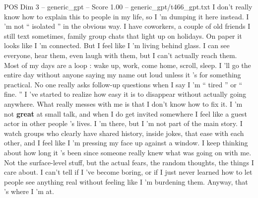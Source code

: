 \begin{textsample}{POS Dim 3 – generic\_gpt – Score 1.00 – generic\_gpt/t466\_gpt.txt}  \label{ex:f3_pos_038}
I don't really know how to explain this to people in my life, so I ’m dumping it here instead.
I ’m not “ isolated ” in the obvious way.
I have coworkers, a couple of old friends I still text sometimes, family group chats that light up on holidays.
On paper it looks like I ’m connected.
But I feel like I ’m living behind glass.
I can see everyone, hear them, even laugh with them, but I can't actually reach them.
Most of my days are a loop : wake up, work, come home, scroll, sleep.
I ’ll go the entire day without anyone saying my name out loud unless it ’s for something practical.
No one really asks follow-up questions when I say I ’m “ tired ” or “ fine. ” I ’ve started to realize how easy it is to disappear without actually going anywhere.
What really messes with me is that I don't know how to fix it.
I ’m not \textbf{great} at small talk, and when I do get invited somewhere I feel like a guest actor in other people ’s lives.
I ’m there, but I ’m not part of the main story.
I watch groups who clearly have shared history, inside jokes, that ease with each other, and I feel like I ’m pressing my face up against a window.
I keep thinking about how long it ’s been since someone really knew what was going on with me.
Not the surface-level stuff, but the actual fears, the random thoughts, the things I care about.
I can't tell if I ’ve become boring, or if I just never learned how to let people see anything real without feeling like I ’m burdening them.
Anyway, that ’s where I ’m at.

\end{textsample}
